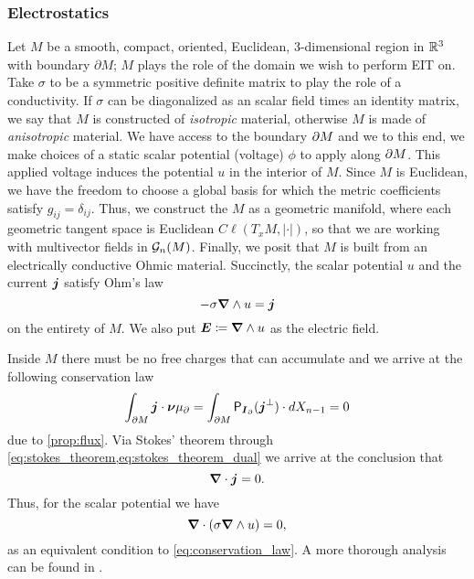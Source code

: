 \subsubsection{Electrostatics}
Let $M$ be a smooth, compact, oriented, Euclidean, 3-dimensional region in $\mathbb{R}^3$ with boundary $\partial M$; $M$ plays the role of the domain we wish to perform EIT on. Take $\sigma$ to be a symmetric positive definite matrix to play the role of a conductivity. If $\sigma$ can be diagonalized as an scalar field times an identity matrix, we say that $M$ is constructed of \emph{isotropic} material, otherwise $M$ is made of \emph{anisotropic} material. We have access to the boundary ${\partial M}$ and we to this end, we make choices of a static scalar potential (voltage) $\phi$ to apply along ${\partial M}$. This applied voltage induces the potential $u$ in the interior of $M$. Since $M$ is Euclidean, we have the freedom to choose a global basis for which the metric coefficients satisfy $g_{ij}=\delta_{ij}$. Thus, we construct the $M$ as a geometric manifold, where each geometric tangent space is Euclidean $C\ell(T_xM, |\cdot|)$, so that we are working with multivector fields in $\mathcal{G}_n(M)$. Finally, we posit that $M$ is built from an electrically conductive Ohmic material. Succinctly, the scalar potential $u$ and the current $\boldsymbol{j}$ satisfy Ohm's law 
\begin{equation}
\label{eq:ohms_law}
-\sigma \boldsymbol{\nabla} \wedge u= \boldsymbol{j}
\end{equation}
on the entirety of $M$. We also put $\boldsymbol{E}\coloneqq \boldsymbol{\nabla} \wedge u$ as the electric field. 

Inside $M$ there must be no free charges that can accumulate and we arrive at the following conservation law
\begin{equation}
\label{eq:conservation_law}
\int_{{\partial M}} \boldsymbol{j} \cdot \boldsymbol{\nu} \mu_\partial = \int_{{\partial M}} \mathsf{P}_{\boldsymbol{I}_\partial}(\boldsymbol{j}^\perp) \cdot dX_{n-1} = 0
\end{equation}
due to \cref{prop:flux}. Via Stokes' theorem through \cref{eq:stokes_theorem,eq:stokes_theorem_dual} we arrive at the conclusion that 
\begin{equation}
\boldsymbol{\nabla} \cdot \boldsymbol{j}= 0.
\end{equation}
Thus, for the scalar potential we have
\begin{equation}
\boldsymbol{\nabla} \cdot (\sigma \boldsymbol{\nabla} \wedge u) = 0,
\end{equation} 
as an equivalent condition to \cref{eq:conservation_law}. A more thorough analysis can be found in \cite{feldman_calderproblem_nodate}. 

